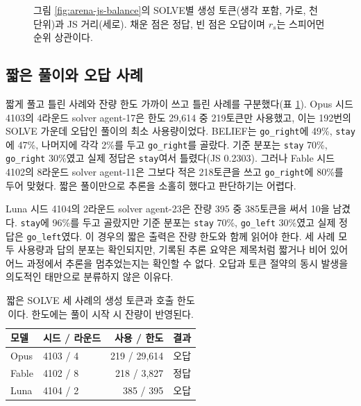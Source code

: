 \begin{figure}[t]
\centering
\resizebox{\textwidth}{!}{}
\caption{그림 \ref{fig:arena-js-balance}의 SOLVE별 생성 토큰(생각 포함, 가로, 천 단위)과 JS 거리(세로). 채운 점은 정답, 빈 점은 오답이며 $r_s$는 스피어먼 순위 상관이다.}
\label{fig:arena-js-used}
\end{figure}

\subsection{짧은 풀이와 오답 사례}\label{sec:app-short-solve}

짧게 풀고 틀린 사례와 잔량 한도 가까이 쓰고 틀린 사례를 구분했다(표 \ref{tab:arena-short-solve}). Opus 시드 4103의 4라운드 solver agent-17은 한도 29,614 중 219토큰만 사용했고, 이는 192번의 SOLVE 가운데 오답인 풀이의 최소 사용량이었다. BELIEF는 \texttt{go\_right}에 49\%, \texttt{stay}에 47\%, 나머지에 각각 2\%를 두고 \texttt{go\_right}를 골랐다. 기준 분포는 \texttt{stay} 70\%, \texttt{go\_right} 30\%였고 실제 정답은 \texttt{stay}여서 틀렸다(JS 0.2303). 그러나 Fable 시드 4102의 8라운드 solver agent-11은 그보다 적은 218토큰을 쓰고 \texttt{go\_right}에 80\%를 두어 맞혔다. 짧은 풀이만으로 추론을 소홀히 했다고 판단하기는 어렵다.

Luna 시드 4104의 2라운드 solver agent-23은 잔량 395 중 385토큰을 써서 10을 남겼다. \texttt{stay}에 96\%를 두고 골랐지만 기준 분포는 \texttt{stay} 70\%, \texttt{go\_left} 30\%였고 실제 정답은 \texttt{go\_left}였다. 이 경우의 짧은 출력은 잔량 한도와 함께 읽어야 한다. 세 사례 모두 사용량과 답의 분포는 확인되지만, 기록된 추론 요약은 제목처럼 짧거나 비어 있어 어느 과정에서 추론을 멈추었는지는 확인할 수 없다. 오답과 토큰 절약의 동시 발생을 의도적인 태만으로 분류하지 않은 이유다.

\begin{table}[t]
\centering
\small
\caption{짧은 SOLVE 세 사례의 생성 토큰과 호출 한도이다. 한도에는 풀이 시작 시 잔량이 반영된다.}
\label{tab:arena-short-solve}
\begin{tabular}{llrl}
\hline
모델 & 시드 / 라운드 & 사용 / 한도 & 결과 \\
\hline
Opus & 4103 / 4 & 219 / 29,614 & 오답 \\
Fable & 4102 / 8 & 218 / 3,827 & 정답 \\
Luna & 4104 / 2 & 385 / 395 & 오답 \\
\hline
\end{tabular}
\end{table}

